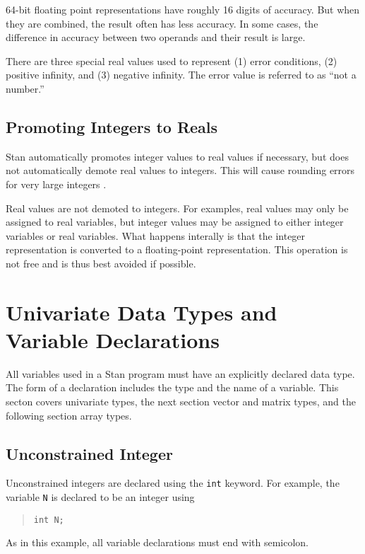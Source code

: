 \documentclass[10pt]{report}
\newcommand{\Stan}{Stan\xspace}
\newcommand{\code}[1]{{\tt #1}}
\begin{document}
64-bit floating point representations have roughly 16 digits of
accuracy.  But when they are combined, the result often has less
accuracy.  In some cases, the difference in accuracy between two
operands and their result is large.  

There are three special real values used to represent (1) error
conditions, (2) positive infinity, and (3) negative infinity.  The
error value is referred to as ``not a number.''

\subsection{Promoting Integers to Reals}

\Stan automatically promotes integer values to real values if
necessary, but does not automatically demote real values to integers.
This will cause rounding errors for very large integers .

Real values are not demoted to integers.  For examples, real values
may only be assigned to real variables, but integer values may be
assigned to either integer variables or real variables.  What happens
interally is that the integer representation is converted to a
floating-point representation.  This operation is not free and is thus
best avoided if possible.


\section{Univariate Data Types and Variable Declarations}

All variables used in a \Stan program must have an explicitly declared
data type.  The form of a declaration includes the type and the name
of a variable.  This secton covers univariate types, the next section
vector and matrix types, and the following section array types.

\subsection{Unconstrained Integer}

Unconstrained integers are declared using the \code{int} keyword.
For example, the variable \code{N} is declared to be an integer using
%
\begin{quote}
\begin{Verbatim} 
int N;
\end{Verbatim}
\end{quote}
% 
As in this example, all variable declarations must end with semicolon.
\end{document}
